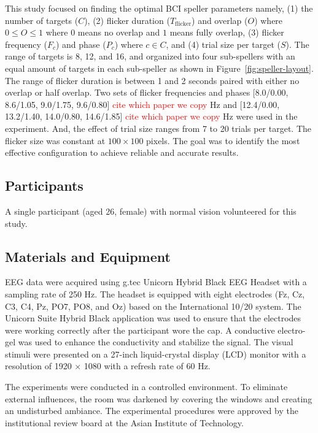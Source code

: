 This study focused on finding the optimal BCI speller parameters namely, (1) the number of targets ($C$), (2) flicker duration ($T_{\text{flicker}}$) and overlap ($O$) where \( 0 \leq O \leq 1 \) where \(0\) means no overlap and \(1\) means fully overlap, (3) flicker frequency ($F_c$) and phase ($P_c$) where $c \in C$, and (4) trial size per target ($S$). 
The range of targets is 8, 12, and 16, and organized into four sub-spellers with an equal amount of targets in each sub-speller as shown in Figure~\ref{fig:speller-layout}. 
The range of flicker duration is between 1 and 2 seconds paired with either no overlap or half overlap. Two sets of flicker frequencies and phases [8.0/0.00, 8.6/1.05, 9.0/1.75, 9.6/0.80] \textcolor{red}{cite which paper we copy} Hz and [12.4/0.00, 13.2/1.40, 14.0/0.80, 14.6/1.85] \textcolor{red}{cite which paper we copy} Hz were used in the experiment.
And, the effect of trial size ranges from 7 to 20 trials per target. 
The flicker size was constant at $100 \times 100$ pixels. 
The goal was to identify the most effective configuration to achieve reliable and accurate results.

\subsection{Participants}
A single participant (aged 26, female) with normal vision volunteered for this study.   

\subsection{Materials and Equipment}
EEG data were acquired using g.tec Unicorn Hybrid Black EEG Headset with a sampling rate of 250 Hz. 
The headset is equipped with eight electrodes (Fz, Cz, C3, C4, Pz, PO7, PO8, and Oz) based on the International 10/20 system. 
The Unicorn Suite Hybrid Black application was used to ensure that the electrodes were working correctly after the participant wore the cap. 
A conductive electro-gel was used to enhance the conductivity and stabilize the signal. 
The visual stimuli were presented on a 27-inch liquid-crystal display (LCD) monitor with a resolution of 1920 $\times$ 1080 with a refresh rate of 60 Hz.

The experiments were conducted in a controlled environment. 
To eliminate external influences, the room was darkened by covering the windows and creating an undisturbed ambiance. 
The experimental procedures were approved by the institutional review board at the Asian Institute of Technology.

